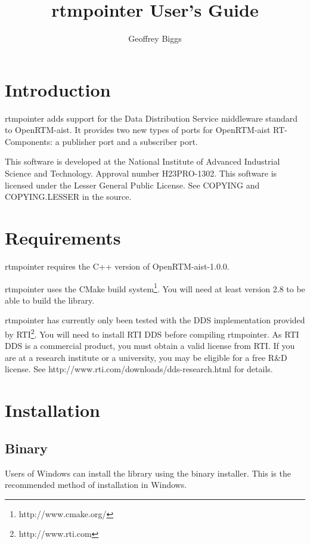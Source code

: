 \documentclass[a4paper,10pt]{article}
\title{rtmpointer User's Guide}
\author{Geoffrey Biggs}
\begin{document}
\maketitle

\section{Introduction}
\label{sec:intro}

rtmpointer adds support for the Data Distribution Service middleware
standard to OpenRTM-aist. It provides two new types of ports for
OpenRTM-aist RT-Components: a publisher port and a subscriber port.

This software is developed at the National Institute of Advanced Industrial
Science and Technology. Approval number H23PRO-1302. This software is licensed
under the Lesser General Public License. See COPYING and COPYING.LESSER in the
source.

\section{Requirements}
\label{sec:requirements}

rtmpointer requires the C++ version of OpenRTM-aist-1.0.0.

rtmpointer uses the CMake build system\footnote{http://www.cmake.org/}. You
will need at least version 2.8 to be able to build the library.

rtmpointer has currently only been tested with the DDS implementation
provided by RTI\footnote{http://www.rti.com}. You will need to install
RTI DDS before compiling rtmpointer. As RTI DDS is a commercial product, you
must obtain a valid license from RTI. If you are at a research institute
or a university, you may be eligible for a free R\&D license. See
http://www.rti.com/downloads/dds-research.html for details.

\section{Installation}
\label{sec:installation}

\subsection{Binary}

Users of Windows can install the library using the binary installer.
This is the recommended method of installation in Windows.
\end{document}
